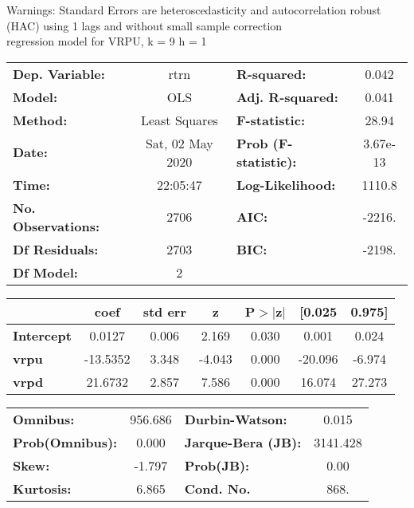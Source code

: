 Warnings: \newline
 [1] Standard Errors are heteroscedasticity and autocorrelation robust (HAC) using 1 lags and without small sample correction\\ 

regression model for VRPU, k = 9 h = 1\begin{center}
\begin{tabular}{lclc}
\toprule
\textbf{Dep. Variable:}    &       rtrn       & \textbf{  R-squared:         } &     0.042   \\
\textbf{Model:}            &       OLS        & \textbf{  Adj. R-squared:    } &     0.041   \\
\textbf{Method:}           &  Least Squares   & \textbf{  F-statistic:       } &     28.94   \\
\textbf{Date:}             & Sat, 02 May 2020 & \textbf{  Prob (F-statistic):} &  3.67e-13   \\
\textbf{Time:}             &     22:05:47     & \textbf{  Log-Likelihood:    } &    1110.8   \\
\textbf{No. Observations:} &        2706      & \textbf{  AIC:               } &    -2216.   \\
\textbf{Df Residuals:}     &        2703      & \textbf{  BIC:               } &    -2198.   \\
\textbf{Df Model:}         &           2      & \textbf{                     } &             \\
\bottomrule
\end{tabular}
\begin{tabular}{lcccccc}
                   & \textbf{coef} & \textbf{std err} & \textbf{z} & \textbf{P$> |$z$|$} & \textbf{[0.025} & \textbf{0.975]}  \\
\midrule
\textbf{Intercept} &       0.0127  &        0.006     &     2.169  &         0.030        &        0.001    &        0.024     \\
\textbf{vrpu}      &     -13.5352  &        3.348     &    -4.043  &         0.000        &      -20.096    &       -6.974     \\
\textbf{vrpd}      &      21.6732  &        2.857     &     7.586  &         0.000        &       16.074    &       27.273     \\
\bottomrule
\end{tabular}
\begin{tabular}{lclc}
\textbf{Omnibus:}       & 956.686 & \textbf{  Durbin-Watson:     } &    0.015  \\
\textbf{Prob(Omnibus):} &   0.000 & \textbf{  Jarque-Bera (JB):  } & 3141.428  \\
\textbf{Skew:}          &  -1.797 & \textbf{  Prob(JB):          } &     0.00  \\
\textbf{Kurtosis:}      &   6.865 & \textbf{  Cond. No.          } &     868.  \\
\bottomrule
\end{tabular}
\end{center}

